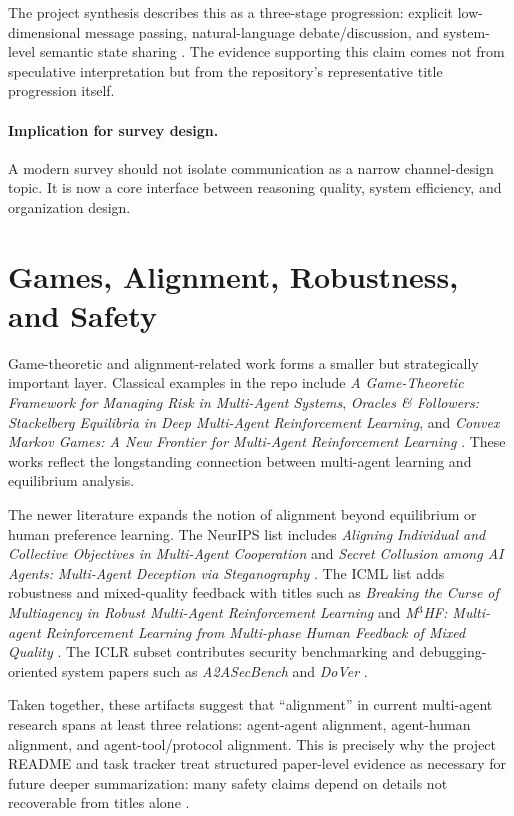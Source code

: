 \documentclass[11pt]{article}
\begin{document}
The project synthesis describes this as a three-stage progression: explicit low-dimensional message passing, natural-language debate/discussion, and system-level semantic state sharing \cite{theme_synthesis}. The evidence supporting this claim comes not from speculative interpretation but from the repository's representative title progression itself.

\paragraph{Implication for survey design.}
A modern survey should not isolate communication as a narrow channel-design topic. It is now a core interface between reasoning quality, system efficiency, and organization design.

\section{Games, Alignment, Robustness, and Safety}
Game-theoretic and alignment-related work forms a smaller but strategically important layer. Classical examples in the repo include \emph{A Game-Theoretic Framework for Managing Risk in Multi-Agent Systems}, \emph{Oracles \& Followers: Stackelberg Equilibria in Deep Multi-Agent Reinforcement Learning}, and \emph{Convex Markov Games: A New Frontier for Multi-Agent Reinforcement Learning} \cite{icml_list}. These works reflect the longstanding connection between multi-agent learning and equilibrium analysis.

The newer literature expands the notion of alignment beyond equilibrium or human preference learning. The NeurIPS list includes \emph{Aligning Individual and Collective Objectives in Multi-Agent Cooperation} and \emph{Secret Collusion among AI Agents: Multi-Agent Deception via Steganography} \cite{neurips_list}. The ICML list adds robustness and mixed-quality feedback with titles such as \emph{Breaking the Curse of Multiagency in Robust Multi-Agent Reinforcement Learning} and \emph{M$^3$HF: Multi-agent Reinforcement Learning from Multi-phase Human Feedback of Mixed Quality} \cite{icml_list}. The ICLR subset contributes security benchmarking and debugging-oriented system papers such as \emph{A2ASecBench} and \emph{DoVer} \cite{iclr_subset}.

Taken together, these artifacts suggest that ``alignment'' in current multi-agent research spans at least three relations: agent-agent alignment, agent-human alignment, and agent-tool/protocol alignment. This is precisely why the project README and task tracker treat structured paper-level evidence as necessary for future deeper summarization: many safety claims depend on details not recoverable from titles alone \cite{project_readme,project_tasks}.
\end{document}
